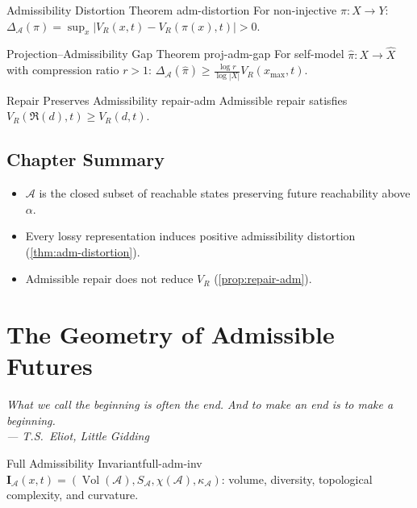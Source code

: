 \documentclass[12pt,twoside,openright]{book}
\newcommand{\adm}{\mathcal{A}}
\newcommand{\repair}{\mathfrak{R}}
\newcommand{\Vol}{\operatorname{Vol}}
\newenvironment{epigraph}[2]{%
  \vspace{1em}\begin{flushright}
  \begin{minipage}{0.72\textwidth}
  \itshape\small #1\\[0.4em]
  \upshape\footnotesize\sffamily\color{DistGray}--- #2
  \end{minipage}\end{flushright}\vspace{1.5em}}{}
\newenvironment{chapsummary}{%
  \begin{tcolorbox}[colback=DistBlue!5,colframe=DistBlue,
    title={\faBookOpen\enspace Summary},
    fonttitle=\sffamily\bfseries\color{white},
    attach boxed title to top left={yshift=-2mm,xshift=4mm},
    boxed title style={colback=DistBlue,rounded corners}]
  \begin{itemize}[nosep,leftmargin=*]}{%
  \end{itemize}\end{tcolorbox}}
\begin{document}
\begin{theorem}{Admissibility Distortion Theorem}%
  {adm-distortion}
  For non-injective $\pi:X\to Y$:
  $\Delta_\adm(\pi)=\sup_x|V_R(x,t)-V_R(\pi(x),t)|>0$.
\end{theorem}

\begin{theorem}{Projection--Admissibility Gap Theorem}%
  {proj-adm-gap}
  For self-model $\hat\pi:X\to\hat{X}$ with compression
  ratio $r>1$:
  $\Delta_\adm(\hat\pi)\ge
  \frac{\log r}{\log|X|}V_R(x_\mathrm{max},t)$.
\end{theorem}

\begin{proposition}{Repair Preserves Admissibility}%
  {repair-adm}
  Admissible repair satisfies $V_R(\repair(d),t)\ge V_R(d,t)$.
\end{proposition}

\section*{Chapter Summary}
\begin{chapsummary}
  \item $\adm$ is the closed subset of reachable states
        preserving future reachability above $\alpha$.
  \item Every lossy representation induces positive
        admissibility distortion
        (\cref{thm:adm-distortion}).
  \item Admissible repair does not reduce $V_R$
        (\cref{prop:repair-adm}).
\end{chapsummary}

\chapter{The Geometry of Admissible Futures}
\label{ch:geometry-futures}
\begin{epigraph}{What we call the beginning is often the end.
  And to make an end is to make a beginning.}%
  {T.S.\ Eliot, \textit{Little Gidding}}
\end{epigraph}

\begin{definition}{Full Admissibility Invariant}{full-adm-inv}
  $\mathbf{I}_\adm(x,t)
  =(\Vol(\adm),S_\adm,\chi(\adm),\kappa_\adm)$:
  volume, diversity, topological complexity, and curvature.
\end{definition}
\end{document}
